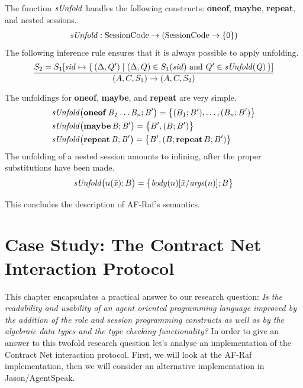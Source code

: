 \documentclass[a4paper,12pt,oneside,fleqn]{book} %
\begin{document}
The function $\it sUnfold$ handles the following constructs: {\bf oneof},
{\bf maybe}, {\bf repeat}, and nested sessions.
\begin{align}
{\it sUnfold} : {\rm SessionCode}\to({\rm SessionCode}\to\{0\})
\end{align}
The following inference rule ensures that it is always possible to apply
unfolding.
\begin{align}
\frac
  {S_2=S_1[{\it sid}\mapsto\{\,(\Delta,Q')
    \mid\text{$(\Delta,Q)\in S_1({\it sid})$ and $Q'\in{\it sUnfold(Q)}$}\,\}]}
  {(A,C,S_1)\to(A,C,S_2)}
\end{align}

The unfoldings for {\bf oneof}, {\bf maybe}, and {\bf repeat} are very
simple.
\begin{align}
&{\it sUnfold\bigl({\bf oneof}\,B_1\ldots B_n; B'\bigr)}
  = \bigl\{ (B_1;B'),\ldots,(B_n;B')\bigr\}
\\
&{\it sUnfold\bigl({\bf maybe}\,B;B'\bigr)}
  = \bigl\{ B', (B;B')\bigr\} \\
&{\it sUnfold\bigl({\bf repeat}\,B;B'\bigr)}
  = \bigl\{ B', (B;{\bf repeat}\,B;B')\bigr\}
\end{align}
The unfolding of a nested session amounts to inlining, after the proper
substitutions have been made.
\begin{align}
{\it sUnfold}\bigl(n(\bar{x}); B\bigr)
  = \bigl\{ {\it body}(n)[\bar{x}/{\it args}(n)]; B \bigr\}
\end{align}

This concludes the description of AF-Raf's semantics.


\chapter{Case Study: The Contract Net Interaction Protocol}\label{ch:casestudy} %

This chapter encapsulates a practical answer to our research question:
\textit{Is the readability and usability of an agent oriented programming
language improved by the addition of the role and session programming
constructs as well as by the algebraic data types and the type checking
functionality?} In order to give an answer to this twofold research
question let's analyse an implementation of the Contract Net interaction
protocol. First, we will look at the AF-Raf implementation, then we will
consider an alternative implementation in Jason/AgentSpeak.
\end{document}
